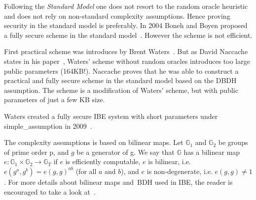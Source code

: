 Following the \textit{Standard Model} one does not resort to the random oracle heuristic and does not rely on non-standard complexity assumptions.
Hence proving security in the standard model is preferably.
In 2004 Boneh and Boyen proposed a fully secure scheme in the standard model~\cite{DBLP:conf/crypto/BonehB04}.
However the scheme is not efficient. 

First practical scheme was introduces by Brent Waters~\cite{DBLP:journals/iacr/Waters04}.
But as David Naccache states in his paper~\cite{DBLP:journals/iacr/Naccache05}, Waters' scheme without random oracles introduces too large public parameters (164\gls{KB}!).
Naccache proves that he was able to construct a practical and fully secure scheme in the standard model based on the \gls{DBDH} assumption.
The scheme is a modification of Waters' scheme, but with public parameters of just a few \gls{KB} size.

Waters created a fully secure \gls{IBE} system with short parameters under \gls{simple_assumption} in 2009~\cite{DBLP:conf/crypto/Waters09}.

The complexity assumptions is based on bilinear maps.
Let $\mathbb{G}_1$ and $\mathbb{G}_2$ be groups of prime order \gls{p}, and $g$ be a generator of \gls{g}. 
We say that $\mathbb{G}$ has a bilinear map $e : \mathbb{G}_1 \times \mathbb{G}_2 \to \mathbb{G}_T$ if $e$ is efficiently computable, $e$ is bilinear, i.e. $e(g^a, g^b) = e(g, g)^{ab}$ (for all $a$ and $b$), and $e$ is non-degenerate, i.e. $e(g,g)\neq 1$.
For more details about bilinear maps and~\gls{BDH} used in \gls{IBE}, the reader is encouraged to take a look at~\cite{DBLP:conf/crypto/BonehF01,DBLP:journals/iacr/Naccache05}.


